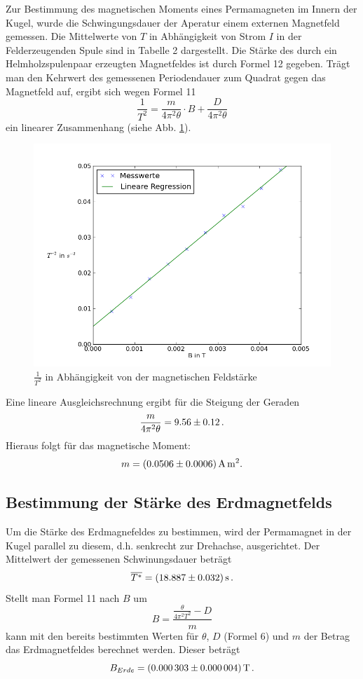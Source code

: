 \documentclass[11pt,ngerman,a4paper]{article}
\begin{document}
Zur Bestimmung des magnetischen Moments eines Permamagneten im Innern der Kugel, wurde die Schwingungsdauer der Aperatur einem externen Magnetfeld gemessen. Die Mittelwerte von $T$ in Abhängigkeit von Strom $I$ in der Felderzeugenden Spule sind in Tabelle 2 dargestellt. Die Stärke des durch ein Helmholzspulenpaar erzeugten Magnetfeldes ist durch Formel 12 gegeben. Trägt man den Kehrwert des gemessenen Periodendauer zum Quadrat gegen das Magnetfeld auf, ergibt sich wegen Formel 11
\begin{equation}
\frac1{T^2}= \frac{m}{4\pi^2\theta}\cdot B + \frac{D}{4\pi^2\theta} 
\end{equation}
ein linearer Zusammenhang (siehe Abb. \ref{ausw}).
\begin{figure}[h]
\centering
\includegraphics[scale=0.7]{Abb4.png}
\caption{$\frac1{T^2}$ in Abhängigkeit von der magnetischen Feldstärke}
\label{ausw}
\end{figure}
 Eine lineare Ausgleichsrechnung ergibt für die Steigung der Geraden 
\[
\frac{m}{4\pi^2\theta} = \num{9.56+-0.12}\,.
\]
Hieraus folgt für das magnetische Moment:
\[
m = \SI{0.0506+-0.0006}{\ampere\meter\squared}.
\]
\subsection{Bestimmung der Stärke des Erdmagnetfelds}
Um die Stärke des Erdmagnefeldes zu bestimmen, wird der Permamagnet in der Kugel parallel zu diesem, d.h. senkrecht zur Drehachse, ausgerichtet. Der Mittelwert der gemessenen Schwinungsdauer beträgt
\[
\overline{T^*} = \SI{18.887+-0.032}{\second}\,.
\]
Stellt man Formel 11 nach $B$ um
\begin{equation}
B = \frac{\frac{\theta}{4\pi^2T^2}-D}{m}
\end{equation}
kann mit den bereits bestimmten Werten für $\theta$, $D$ (Formel 6) und $m$ der Betrag das Erdmagnetfeldes berechnet werden. Dieser beträgt
\[
B_{Erde} = \SI{0.000303+-0.000004}{\tesla}\,.
\]
\end{document}
